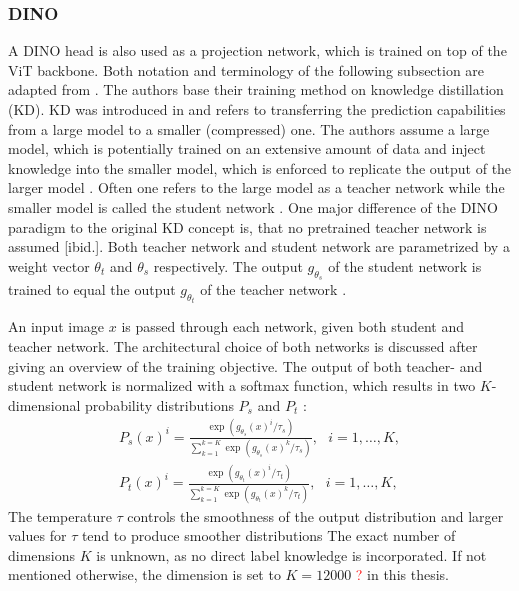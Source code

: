 \subsubsection{DINO}
A DINO \citep{Caron2021} head is also used as a projection network, which is trained on top of the ViT backbone.
Both notation and terminology of the following subsection are adapted from \citep{Caron2021}.
The authors base their training method on knowledge distillation (KD).
KD was introduced in \citep{Hinton2015} and refers to transferring the prediction capabilities from a large model to a smaller (compressed) one.
The authors assume a large model, which is potentially trained on an extensive amount of data and inject knowledge into the smaller model, which is enforced to replicate the output of the larger model \citep{Hinton2015,Caron2021}.
Often one refers to the large model as a teacher network while the smaller model is called the student network \citep{Caron2021}. 
One major difference of the DINO paradigm to the original KD concept is, that no pretrained teacher network is assumed [ibid.].
Both teacher network and student network are parametrized by a weight vector $\theta_t$ and $\theta_s$ respectively.
The output $g_{\theta_s}$ of the student network is trained to equal the output $g_{\theta_t}$ of the teacher network \citep{Caron2021}.
\par
An input image $x$ is passed through each network, given both student and teacher network.
The architectural choice of both networks is discussed after giving an overview of the training objective.
The output of both teacher- and student network is normalized with a softmax function, which results in two $K$-dimensional probability distributions $P_s$ and $P_t$ \citep{Caron2021}:
\begin{align}
	P_{s}(x)^i = \frac{\exp(g_{\theta_{s}}(x)^i/\tau_{s})}{\sum_{k=1}^{k=K}\exp(g_{\theta_{s}}(x)^k/\tau_{s})}, \hspace{8pt} i=1,\dots,K, \\
	P_{t}(x)^i = \frac{\exp(g_{\theta_{t}}(x)^i/\tau_{t})}{\sum_{k=1}^{k=K}\exp(g_{\theta_{t}}(x)^k/\tau_{t})}, \hspace{8pt} i=1,\dots,K,
	\label{equation:dino-softmax}
\end{align}
The temperature $\tau$ controls the smoothness of the output distribution \citep{Caron2021} and larger values for $\tau$ tend to produce smoother distributions \textcolor{red}{\citep{Hinton2015}}
The exact number of dimensions $K$ is unknown, as no direct label knowledge is incorporated.
If not mentioned otherwise, the dimension is set to $K=12000$ \textcolor{red}{?} in this thesis.
